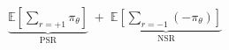 \documentclass[preview]{standalone}
\begin{document}
\begin{align*}
\underbrace{\mathbb{E}\!\left[\sum_{r=+1}\pi_\theta\right]}_{\text{PSR}} \;+\; \underbrace{\mathbb{E}\!\left[\sum_{r=-1}(-\pi_\theta)\right]}_{\text{NSR}}
\end{align*}
\end{document}

